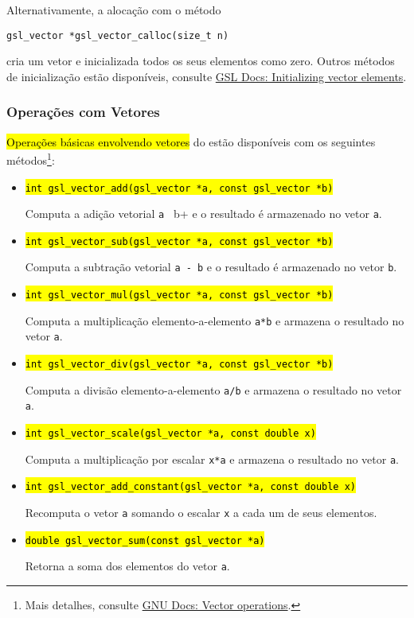 \documentclass[12pt]{article}
\begin{document}
\begin{obs}
  Alternativamente, a alocação com o método
\begin{lstlisting}
gsl_vector *gsl_vector_calloc(size_t n)
\end{lstlisting}
  cria um vetor e inicializada todos os seus elementos como zero. Outros métodos de inicialização estão disponíveis, consulte \href{https://www.gnu.org/software/gsl/doc/html/vectors.html#initializing-vector-elements}{GSL Docs: Initializing vector elements}.
\end{obs}

\subsubsection{Operações com Vetores}

\hl{Operações básicas envolvendo vetores} do {\gsl} estão disponíveis com os seguintes métodos\footnote{Mais detalhes, consulte \href{https://www.gnu.org/software/gsl/doc/html/vectors.html\#vector-operations}{GNU Docs: Vector operations}.}:
\begin{itemize}
\item \hl{{\lstinline!int gsl_vector_add(gsl_vector *a, const gsl_vector *b)!}}

  Computa a adição vetorial \lstinline+a + b+ e o resultado é armazenado no vetor \lstinline+a+.

\item \hl{{\lstinline!int gsl_vector_sub(gsl_vector *a, const gsl_vector *b)!}}

  Computa a subtração vetorial \lstinline!a - b! e o resultado é armazenado no vetor \lstinline!b!.

\item \hl{{\lstinline!int gsl_vector_mul(gsl_vector *a, const gsl_vector *b)!}}

  Computa a multiplicação elemento-a-elemento \lstinline!a*b! e armazena o resultado no vetor \lstinline!a!.

\item \hl{{\lstinline!int gsl_vector_div(gsl_vector *a, const gsl_vector *b)!}}

  Computa a divisão elemento-a-elemento \lstinline!a/b! e armazena o resultado no vetor \lstinline!a!.

\item \hl{{\lstinline!int gsl_vector_scale(gsl_vector *a, const double x)!}}

  Computa a multiplicação por escalar \lstinline!x*a! e armazena o resultado no vetor \lstinline!a!.

\item \hl{{\lstinline!int gsl_vector_add_constant(gsl_vector *a, const double x)!}}

  Recomputa o vetor \lstinline!a! somando o escalar \lstinline!x! a cada um de seus elementos.

\item \hl{{\lstinline!double gsl_vector_sum(const gsl_vector *a)!}}

  Retorna a soma dos elementos do vetor \lstinline!a!.
\end{itemize}
\end{document}
